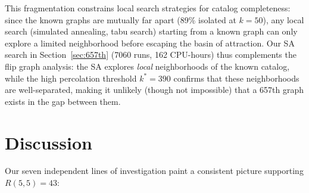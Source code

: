 \documentclass[11pt,a4paper]{article}
\theoremstyle{definition}
\theoremstyle{remark}
\begin{document}
This fragmentation constrains local search strategies for
catalog completeness: since the known graphs are mutually far
apart (89\% isolated at $k = 50$), any local search
(simulated annealing, tabu search) starting from a known graph
can only explore a limited neighborhood before escaping
the basin of attraction.  Our SA search in
Section~\ref{sec:657th} (7060 runs, 162 CPU-hours) thus
complements the flip graph analysis: the SA explores
\emph{local} neighborhoods of the known catalog, while
the high percolation threshold $k^* = 390$ confirms that
these neighborhoods are well-separated, making it unlikely
(though not impossible) that a 657th graph exists in the
gap between them.

\section{Discussion}
\label{sec:discussion}

Our seven independent lines of investigation paint a consistent
picture supporting $R(5,5) = 43$:
\end{document}
